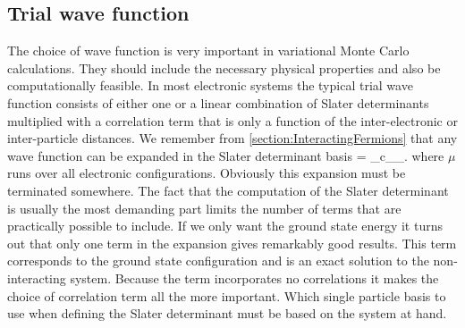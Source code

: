 \subsection{Trial wave function}
The choice of wave function is very important in variational Monte Carlo 
calculations. They should include the necessary physical properties and also be computationally feasible. In most electronic systems the typical trial wave function consists of either one or a linear combination of Slater determinants multiplied with a correlation term that is only a function of the inter-electronic or inter-particle distances. We remember from \ref{section:InteractingFermions} that any wave function can be expanded in the Slater determinant basis
\be
\Psi = \Sum_\mu c_\mu \psi_\mu.
\ee
where $\mu$ runs over all electronic configurations. Obviously this expansion must be terminated somewhere. 
The fact that the computation of the Slater determinant is usually the most demanding part limits the number of terms that are practically possible to include. If we only want the ground state energy it turns out that only one term in the expansion gives remarkably good results. This term corresponds to the ground state configuration and is an exact solution to the non-interacting system. Because the term incorporates no correlations it makes the choice of correlation term all the more important. Which single particle basis to use when defining the Slater determinant must be based on the system at hand. 
\newline


